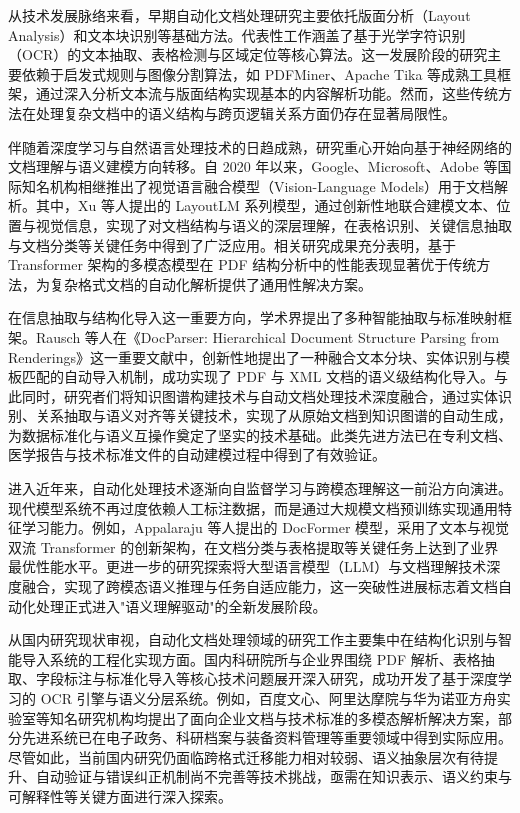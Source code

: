 从技术发展脉络来看，早期自动化文档处理研究主要依托版面分析（Layout Analysis）和文本块识别等基础方法。代表性工作涵盖了基于光学字符识别（OCR）的文本抽取、表格检测与区域定位等核心算法。这一发展阶段的研究主要依赖于启发式规则与图像分割算法，如 PDFMiner、Apache Tika 等成熟工具框架，通过深入分析文本流与版面结构实现基本的内容解析功能。然而，这些传统方法在处理复杂文档中的语义结构与跨页逻辑关系方面仍存在显著局限性。

伴随着深度学习与自然语言处理技术的日趋成熟，研究重心开始向基于神经网络的文档理解与语义建模方向转移。自 2020 年以来，Google、Microsoft、Adobe 等国际知名机构相继推出了视觉语言融合模型（Vision-Language Models）用于文档解析。其中，Xu 等人提出的 LayoutLM 系列模型\cite{Xu2020LayoutLM,Huang2022LayoutLMv3}，通过创新性地联合建模文本、位置与视觉信息，实现了对文档结构与语义的深层理解，在表格识别、关键信息抽取与文档分类等关键任务中得到了广泛应用。相关研究成果充分表明，基于 Transformer 架构的多模态模型在 PDF 结构分析中的性能表现显著优于传统方法，为复杂格式文档的自动化解析提供了通用性解决方案。

在信息抽取与结构化导入这一重要方向，学术界提出了多种智能抽取与标准映射框架。Rausch 等人在《DocParser: Hierarchical Document Structure Parsing from Renderings》这一重要文献中\cite{Rausch2021DocParser}，创新性地提出了一种融合文本分块、实体识别与模板匹配的自动导入机制，成功实现了 PDF 与 XML 文档的语义级结构化导入。与此同时，研究者们将知识图谱构建技术与自动文档处理技术深度融合，通过实体识别、关系抽取与语义对齐等关键技术，实现了从原始文档到知识图谱的自动生成，为数据标准化与语义互操作奠定了坚实的技术基础。此类先进方法已在专利文档、医学报告与技术标准文件的自动建模过程中得到了有效验证。

进入近年来，自动化处理技术逐渐向自监督学习与跨模态理解这一前沿方向演进。现代模型系统不再过度依赖人工标注数据，而是通过大规模文档预训练实现通用特征学习能力。例如，Appalaraju 等人提出的 DocFormer 模型\cite{Appalaraju2021DocFormer}，采用了文本与视觉双流 Transformer 的创新架构，在文档分类与表格提取等关键任务上达到了业界最优性能水平。更进一步的研究探索将大型语言模型（LLM）与文档理解技术深度融合，实现了跨模态语义推理与任务自适应能力\cite{Wang2023DocumentLLM}，这一突破性进展标志着文档自动化处理正式进入"语义理解驱动"的全新发展阶段。

从国内研究现状审视，自动化文档处理领域的研究工作主要集中在结构化识别与智能导入系统的工程化实现方面。国内科研院所与企业界围绕 PDF 解析、表格抽取、字段标注与标准化导入等核心技术问题展开深入研究，成功开发了基于深度学习的 OCR 引擎与语义分层系统。例如，百度文心、阿里达摩院与华为诺亚方舟实验室等知名研究机构均提出了面向企业文档与技术标准的多模态解析解决方案，部分先进系统已在电子政务、科研档案与装备资料管理等重要领域中得到实际应用。尽管如此，当前国内研究仍面临跨格式迁移能力相对较弱、语义抽象层次有待提升、自动验证与错误纠正机制尚不完善等技术挑战，亟需在知识表示、语义约束与可解释性等关键方面进行深入探索。

